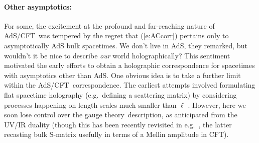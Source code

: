 \documentclass[12pt,a4paper]{article}
\def\req#1{(\ref{#1})}
\def\AC{AdS/CFT}
\def\GT{gauge theory}
\def\Rads{\ell}
\begin{document}
\paragraph{Other asymptotics:}  %
For some, the excitement at the profound and far-reaching nature of \AC\ was tempered by the regret that \req{e:ACcorr} pertains only to asymptotically AdS bulk spacetimes.  We don't live in AdS, they remarked, but wouldn't it be nice to  describe {\it our} world holographically?
This sentiment motivated the early efforts to obtain a holographic correspondence for  spacetimes with asymptotics other than AdS.
One obvious idea is to take a further limit within the \AC\ correspondence.  The earliest attempts involved formulating flat spacetime holography (e.g.\ defining a scattering matrix) by considering processes happening on length scales much smaller than $\Rads$ \cite{Susskind:1998vk,Polchinski:1999ry,Giddings:1999jq}.
However, here we soon lose control over the \GT\ description, as anticipated from the UV/IR duality (though this has been recently revisited in e.g.\ \cite{Heemskerk:2009pn,Penedones:2010ue}, the latter recasting bulk S-matrix usefully in terms of a Mellin amplitude in CFT).
\end{document}
